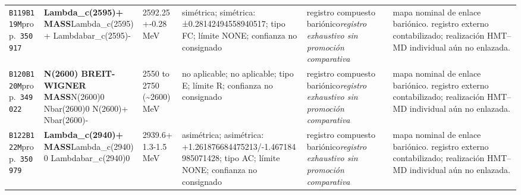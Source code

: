 \begin{landscape}
\begin{longtable}{L{1.85cm}L{4.45cm}L{2.35cm}L{4.05cm}L{3.35cm}L{7.15cm}}
\texttt{B119}\newline \texttt{B119M}\newline prop.\ \texttt{350917} & \textbf{Lambda\_\allowbreak{}c(2595)+ MASS}\newline Lambda\_\allowbreak{}c(2595)+ \textbar{}\allowbreak{} Lambdabar\_\allowbreak{}c(2595)- & 2592.25+-0.28\,MeV & simétrica; simétrica: ±0.28142494558940517; tipo FC; límite NONE; confianza no consignado & registro compuesto bariónico\newline \emph{registro exhaustivo sin promoción comparativa} & mapa nominal de enlace bariónico. registro externo contabilizado; realización HMT--MD individual aún no enlazada. \\
\texttt{B120}\newline \texttt{B120M}\newline prop.\ \texttt{349022} & \textbf{N(2600) BREIT-WIGNER MASS}\newline N(2600)0 \textbar{}\allowbreak{} Nbar(2600)0 \textbar{}\allowbreak{} N(2600)+ \textbar{}\allowbreak{} Nbar(2600)- & 2550 to 2750 (\textasciitilde{}2600)\,MeV & no aplicable; no aplicable; tipo E; límite R; confianza no consignado & registro compuesto bariónico\newline \emph{registro exhaustivo sin promoción comparativa} & mapa nominal de enlace bariónico. registro externo contabilizado; realización HMT--MD individual aún no enlazada. \\
\texttt{B122}\newline \texttt{B122M}\newline prop.\ \texttt{350979} & \textbf{Lambda\_\allowbreak{}c(2940)+ MASS}\newline Lambda\_\allowbreak{}c(2940)0 \textbar{}\allowbreak{} Lambdabar\_\allowbreak{}c(2940)0 & 2939.6+1.3-1.5\,MeV & asimétrica; asimétrica: +1.261876684475213/-1.467184985071428; tipo AC; límite NONE; confianza no consignado & registro compuesto bariónico\newline \emph{registro exhaustivo sin promoción comparativa} & mapa nominal de enlace bariónico. registro externo contabilizado; realización HMT--MD individual aún no enlazada. \\

\end{longtable}
\end{landscape}
